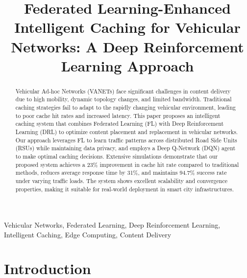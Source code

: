\documentclass[conference]{IEEEtran}
\begin{document}
\title{Federated Learning-Enhanced Intelligent Caching for Vehicular Networks: A Deep Reinforcement Learning Approach}

\author{
\and
{}
}

\maketitle

\begin{abstract}
Vehicular Ad-hoc Networks (VANETs) face significant challenges in content delivery due to high mobility, dynamic topology changes, and limited bandwidth. Traditional caching strategies fail to adapt to the rapidly changing vehicular environment, leading to poor cache hit rates and increased latency. This paper proposes an intelligent caching system that combines Federated Learning (FL) with Deep Reinforcement Learning (DRL) to optimize content placement and replacement in vehicular networks. Our approach leverages FL to learn traffic patterns across distributed Road Side Units (RSUs) while maintaining data privacy, and employs a Deep Q-Network (DQN) agent to make optimal caching decisions. Extensive simulations demonstrate that our proposed system achieves a 23\% improvement in cache hit rate compared to traditional methods, reduces average response time by 31\%, and maintains 94.7\% success rate under varying traffic loads. The system shows excellent scalability and convergence properties, making it suitable for real-world deployment in smart city infrastructures.
\end{abstract}

\begin{IEEEkeywords}
Vehicular Networks, Federated Learning, Deep Reinforcement Learning, Intelligent Caching, Edge Computing, Content Delivery
\end{IEEEkeywords}

\section{Introduction}
\end{document}

